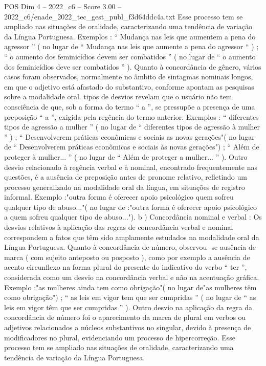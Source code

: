 \begin{textsample}{POS Dim 4 – 2022\_c6 – Score 3.00 – 2022\_c6/enade\_2022\_tec\_gest\_publ\_f3d64ddc4a.txt}
Esse processo tem se ampliado nas situações de oralidade, caracterizando uma tendência de variação da Língua Portuguesa.
Exemplos : “ Mudança nas leis que aumentem a pena do agressor ” ( no lugar de “ Mudança nas leis que aumente a pena do agressor “ ) ; “ o aumento dos feminicídios devem ser combatidos ” ( no lugar de “ o aumento dos feminicídios deve ser combatidos ” ).
Quanto à concordância de gênero, vários casos foram observados, normalmente no âmbito de sintagmas nominais longos, em que o adjetivo está afastado do substantivo, conforme apontam as pesquisas sobre a modalidade oral. tipos de desvios revelam que o usuário não tem consciência de que, sob a forma do termo “ a ”, se pressupõe a presença de uma preposição “ a ”, exigida pela regência do termo anterior.
Exemplos : “ diferentes tipos de agressão a mulher ” ( no lugar de “ diferentes tipos de agressão à mulher ” ) ; “ Desenvolverem práticas econômicas e sociais as novas gerações"( no lugar de “ Desenvolverem práticas econômicas e sociais às novas gerações") ; “ Além de proteger à mulher... ” ( no lugar de “ Além de proteger a mulher... ” ).
Outro desvio relacionado à regência verbal e à nominal, encontrado frequentemente nas questões, é a ausência de preposição antes de pronome relativo, refletindo um processo generalizado na modalidade oral da língua, em situações de registro informal.
Exemplo :"outra forma é oferecer apoio psicológico quem sofreu qualquer tipo de abuso..."( no lugar de :"outra forma é oferecer apoio psicológico a quem sofreu qualquer tipo de abuso..."). b ) Concordância nominal e verbal : Os desvios relativos à aplicação das regras de concordância verbal e nominal correspondem a fatos que têm sido amplamente estudados na modalidade oral da Língua Portuguesa.
Quanto à concordância de número, observou -se ausência de marca ( com sujeito anteposto ou posposto ), como por exemplo a ausência de acento circunflexo na forma plural do presente do indicativo do verbo “ ter ”, considerada como um desvio na concordância verbal e não na acentuação gráfica.
Exemplo :"as mulheres ainda tem como obrigação"( no lugar de"as mulheres têm como obrigação") ; “ as leis em vigor tem que ser cumpridas ” ( no lugar de “ as leis em vigor têm que ser cumpridas ” ).
Outro desvio na aplicação da regra da concordância de número foi o aparecimento da marca de plural em verbos ou adjetivos relacionados a núcleos substantivos no singular, devido à presença de modificadores no plural, evidenciando um processo de hipercorreção.
Esse processo tem se ampliado nas situações de oralidade, caracterizando uma tendência de variação da Língua Portuguesa.

\end{textsample}
